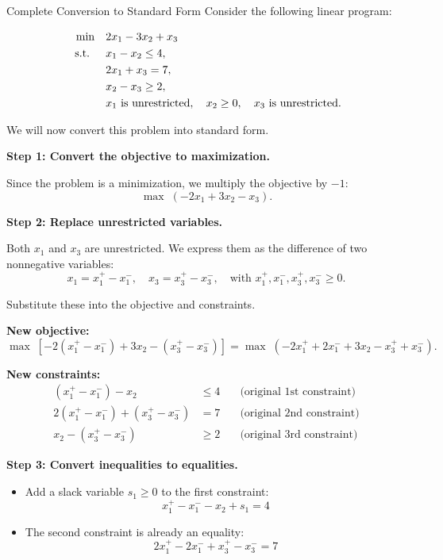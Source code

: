 \begin{example}{Complete Conversion to Standard Form}
Consider the following linear program:

\[
\begin{aligned}
\min \quad & 2x_1 - 3x_2 + x_3 \\
\text{ s.t. } \quad 
& x_1 - x_2 \leq 4, \\
& 2x_1 + x_3 = 7, \\
& x_2 - x_3 \geq 2, \\
& x_1 \text{ is unrestricted}, \quad x_2 \geq 0, \quad x_3 \text{ is unrestricted}.
\end{aligned}
\]

We will now convert this problem into standard form.

\medskip
\textbf{Step 1: Convert the objective to maximization.}

Since the problem is a minimization, we multiply the objective by \( -1 \):
\[
\max \; (-2x_1 + 3x_2 - x_3).
\]

\medskip
\textbf{Step 2: Replace unrestricted variables.}

Both \( x_1 \) and \( x_3 \) are unrestricted. We express them as the difference of two nonnegative variables:
\[
x_1 = x_1^+ - x_1^-, \quad x_3 = x_3^+ - x_3^-, \quad \text{with } x_1^+, x_1^-, x_3^+, x_3^- \geq 0.
\]

Substitute these into the objective and constraints.

\smallskip
\textbf{New objective:}
\[
\max \; [-2(x_1^+ - x_1^-) + 3x_2 - (x_3^+ - x_3^-)] = \max \; (-2x_1^+ + 2x_1^- + 3x_2 - x_3^+ + x_3^-).
\]

\smallskip
\textbf{New constraints:}
\begin{align*}
(x_1^+ - x_1^-) - x_2 &\leq 4 \quad &\text{(original 1st constraint)} \\
2(x_1^+ - x_1^-) + (x_3^+ - x_3^-) &= 7 \quad &\text{(original 2nd constraint)} \\
x_2 - (x_3^+ - x_3^-) &\geq 2 \quad &\text{(original 3rd constraint)}
\end{align*}

\medskip
\textbf{Step 3: Convert inequalities to equalities.}

\begin{itemize}
    \item Add a slack variable \( s_1 \geq 0 \) to the first constraint:
    \[
    x_1^+ - x_1^- - x_2 + s_1 = 4
    \]

    \item The second constraint is already an equality:
    \[
    2x_1^+ - 2x_1^- + x_3^+ - x_3^- = 7
    \]


\end{itemize}
\end{example}

